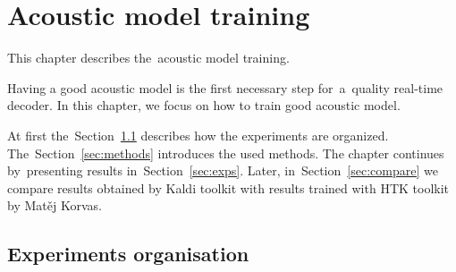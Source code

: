\chapter{Acoustic model training}
\label{cha:train}

This chapter describes the~acoustic model training.

Having a good acoustic model is the first necessary step for~a~quality real-time decoder.
In this chapter, we focus on how to train good acoustic model.

At first the~Section~\ref{sec:setup} describes how the experiments are organized.  
The~Section~\ref{sec:methods} introduces the used methods. 
The chapter continues by~presenting results in~Section~\ref{sec:exps}. 
Later, in~Section~\ref{sec:compare} we compare results obtained by Kaldi toolkit with results
trained with \ac{HTK} toolkit by Matěj Korvas\cite{lrec2014}.

\section{Experiments organisation} 
\label{sec:setup}

